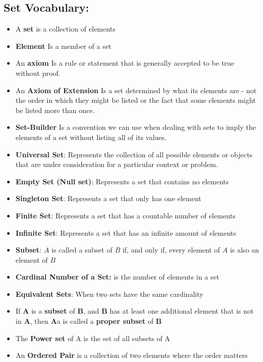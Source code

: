 \documentclass{report}
\begin{document}
      \subsection{Set Vocabulary:}
      \begin{itemize}
        \item A \textbf{set} is a collection of elements 
        \item \textbf{Element} Is a member of a set
        \item An \textbf{axiom} Is a rule or statement that is generally accepted to be true without proof.
        \item An \textbf{Axiom of Extension} Is a set determined by what its elements are - not the order in which they might be listed or the fact that some elements might be listed more than once.
        \item \textbf{Set-Builder} Is a convention we can use when dealing with sets to imply the elements of a set without listing all of its values.
        \item \textbf{Universal Set}: Represents the collection of all possible elements or objects that are under consideration for a particular context or problem.
        \item \textbf{Empty Set (Null set)}: Represents a set that contains no elements
        \item \textbf{Singleton Set}: Represents a set that only has one element
        \item \textbf{Finite Set}: Represents a set that has a countable number of elements
        \item \textbf{Infinite Set}: Represents a set that has an infinite amount of elements
        \item \textbf{Subset}: $A $ is called a subset of $B $ if, and only if, every element of $A $ is also an element of $B$
        \item \textbf{Cardinal Number of a Set:} is the number of elements in a set
        \item \textbf{Equivalent Sets}: When two sets have the same cardinality
        \item If \textbf{A} is a \textbf{subset} of \textbf{B}, and \textbf{B} has at least one additional element that is not in \textbf{A}, then \textbf{A}a is called a \textbf{proper subset} of \textbf{B}
        \item The \textbf{Power set} of A is the set of all subsets of A
        \item An \textbf{Ordered Pair} is a collection of two elements where the order matters

\end{itemize}
\end{document}
